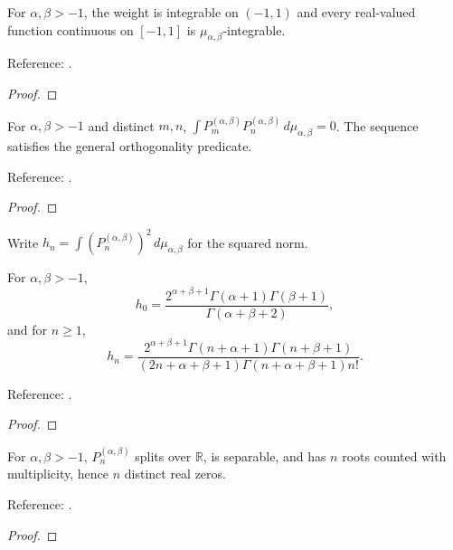 \begin{theorem}
\label{thm:jacobi-integrable}
\leanok
For $\alpha,\beta>-1$, the weight is integrable on $(-1,1)$ and every
real-valued function continuous on $[-1,1]$ is $\mu_{\alpha,\beta}$-integrable.


Reference: \cite[Table 18.3.1]{dlmf}.
\end{theorem}
\begin{proof}
\leanok
\end{proof}

\begin{theorem}
\label{thm:jacobi-pairwise}
\leanok
For $\alpha,\beta>-1$ and distinct $m,n$,
$\int P_m^{(\alpha,\beta)}P_n^{(\alpha,\beta)}\,d\mu_{\alpha,\beta}=0$.
The sequence satisfies the general orthogonality predicate.

Reference: \cite[Table 18.3.1]{dlmf}.
\end{theorem}
\begin{proof}
\leanok
\end{proof}

Write $h_n=\int (P_n^{(\alpha,\beta)})^2\,d\mu_{\alpha,\beta}$ for the squared norm.

\begin{theorem}
\label{thm:jacobi-norm}
\leanok
For $\alpha,\beta>-1$,
\[h_0=\frac{2^{\alpha+\beta+1}\Gamma(\alpha+1)\Gamma(\beta+1)}{\Gamma(\alpha+\beta+2)},\]
and for $n\ge1$,
\[h_n=\frac{2^{\alpha+\beta+1}\Gamma(n+\alpha+1)\Gamma(n+\beta+1)}
 {(2n+\alpha+\beta+1)\Gamma(n+\alpha+\beta+1)n!}.\]


Reference: \cite[Table 18.3.1]{dlmf}.
\end{theorem}
\begin{proof}
\leanok
\end{proof}

\begin{theorem}
\label{thm:jacobi-real-zeros}
\leanok
For $\alpha,\beta>-1$, $P_n^{(\alpha,\beta)}$ splits over $\mathbb{R}$, is separable, and has $n$ roots counted with multiplicity, hence $n$ distinct real zeros.

Reference: \cite[18.2(vi)]{dlmf}.
\end{theorem}
\begin{proof}
\leanok
\end{proof}

